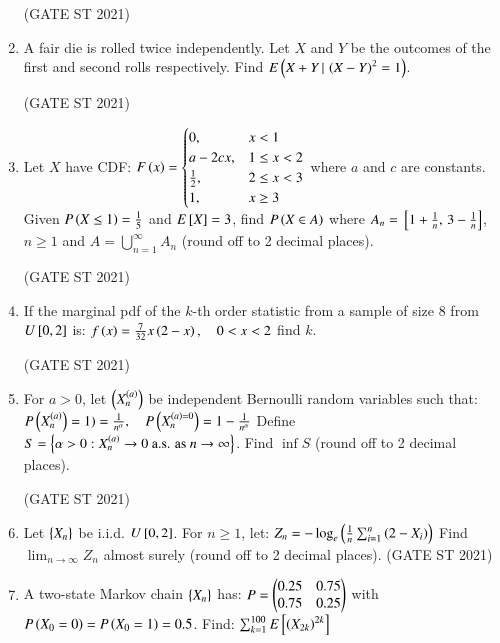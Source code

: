 \documentclass[journal,12pt,onecolumn]{IEEEtran}
\theoremstyle{remark}
\begin{document}
\begin{enumerate}
\hfill (GATE ST 2021) \\

\item
A fair die is rolled twice independently.  
Let $X$ and $Y$ be the outcomes of the first and second rolls respectively.  
Find $E\left(X + Y \, | \, \left(X - Y\right)^2 = 1\right)$.

\hfill (GATE ST 2021) \\

\item
Let $X$ have CDF:
$
F\brak{x} =
\begin{cases}
    
0, & x < 1 \\
a - 2c x, & 1 \le x < 2 \\
\frac12, & 2 \le x < 3 \\
1, & x \ge 3
\end{cases}
$
where $a$ and $c$ are constants.  
Given $P\brak{X \leq 1} = \frac15$ and $E\sbrak{X} = 3$,  
find $P\brak{X \in A}$ where $A_n = \sbrak{1+\frac1n,\, 3 - \frac1n}$, $n \ge 1$ and $A = \bigcup_{n=1}^\infty A_n$ (round off to 2 decimal places).

\hfill (GATE ST 2021) \\


\item
If the marginal pdf of the $k$-th order statistic from a sample of size 8 from $U{}\left[0,2\right]$ is:
$
f\left(x\right) = \frac{7}{32} x \left(2-x\right), \quad 0 < x < 2
$
find $k$.

\hfill (GATE ST 2021) \\

\item
For $a > 0$, let $\left( X_n^{\left(a\right)} \right)$ be independent Bernoulli random variables such that:
$
P\left(X_n^{\left(a\right)}\right) = 1) = \frac{1}{n^\alpha}, \quad P\left(X_n^{\left(a\right) = 0}\right) = 1 - \frac{1}{n^\alpha}
$
Define $S = \left\{ \alpha > 0 : X_n^{\left(a\right)} \to 0 \ \text{a.s. as} \ n \to \infty \right\}$.  
Find $\inf S$ (round off to 2 decimal places).

\hfill (GATE ST 2021) \\

\item
Let $\left\{X_n\right\}$ be i.i.d. $U{}\left[0,2\right]$. For $n \ge 1$, let:
$
Z_n = - \log_e \left( \frac{1}{n} \sum_{i=1}^n \left(2 - X_i\right) \right)
$
Find $\lim_{n \to \infty} Z_n$ almost surely (round off to 2 decimal places).
\hfill (GATE ST 2021) \\

\item
A two-state Markov chain $\left\{X_n\right\}$ has:
$
P = \begin{pmatrix} 0.25 & 0.75 \\ 0.75 & 0.25 \end{pmatrix}
$
with $P\left(X_0 = 0\right) = P\left(X_0 = 1\right) = 0.5$. Find:
$
\sum_{k=1}^{100} E{}\left[\left(X_{2k}\right)^{2k}\right]
$


\end{enumerate}
\end{document}
